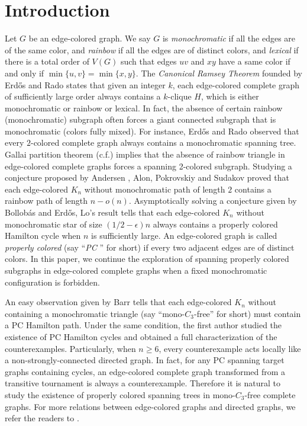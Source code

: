 \documentclass[11pt,a4paper]{article}
\theoremstyle{definition}
\begin{document}
\section{Introduction}
Let $G$ be an edge-colored graph. We say $G$ is {\it monochromatic} if all the edges are of the same color, and {\it rainbow} if all the edges are of distinct colors, and {\it lexical} if there is a total order of $V(G)$ such that edges $uv$ and $xy$ have a same color if and only if $\min\{u,v\}=\min\{x,y\}$. The {\it Canonical Ramsey Theorem} founded by Erd\H{o}s and Rado \cite{erdos_combinatorial_1950} states that given an integer $k$, each edge-colored complete graph of sufficiently large order always contains a $k$-clique $H$, which is either monochromatic or rainbow or lexical. In fact, the absence of certain rainbow (monochromatic) subgraph often forces a giant connected subgraph that is monochromatic (colors fully mixed). For instance, Erd\H{o}s and Rado \cite{erdos_combinatorial_1950} observed that every $2$-colored complete graph always contains a monochromatic spanning tree. Gallai partition theorem \cite{gallai_transitiv_1967}(c.f.\cite{gyarfas_edge_2004}) implies that the absence of rainbow triangle in edge-colored complete graphs forces a spanning 2-colored subgraph.
Studying a conjecture proposed by Andersen \cite{andersen_hamilton_1989}, Alon, Pokrovskiy and Sudakov \cite{alon_random_2017} proved that each edge-colored $K_n$ without monochromatic path of length $2$ contains a rainbow path of length $n-o(n)$. Asymptotically solving a conjecture given by Bollob\'{a}s and Erd\H{o}s\cite{bollobas_alternating_1976}, Lo's result \cite{lo_properly_2016} tells that each edge-colored $K_n$ without monochromatic star of size $(1/2-\epsilon)n$ always contains a properly colored Hamilton cycle when $n$ is sufficiently large. An edge-colored graph is called {\it properly colored} (say ``{\it PC }'' for short) if every two adjacent edges are of distinct colors.
In this paper, we continue the exploration of spanning properly colored subgraphs in edge-colored complete graphs when a fixed monochromatic configuration is forbidden.

An easy observation given by Barr \cite{barr_properly_1998} tells that each edge-colored $K_n$ without containing a monochromatic triangle (say ``mono-$C_3$-free'' for short) must contain a PC Hamilton path. Under the same condition, the first author \cite{li_properly_2021} studied the existence of PC Hamilton cycles and obtained a full characterization of the counterexamples. Particularly, when $n\geq 6$, every counterexample acts locally like a non-strongly-connected directed graph. In fact, for any PC spanning target graphs containing cycles, an edge-colored complete graph transformed from a transitive tournament is always a counterexample. Therefore it is natural to study the existence of properly colored spanning trees in mono-$C_3$-free complete graphs. For more relations between edge-colored graphs and directed graphs, we refer the readers to \cite{fujita_decomposing_2019, li_classification_2020, li_vertexdisjoint_2020, aharoni_rainbow_2019, ding_properly_2022}.
\end{document}
